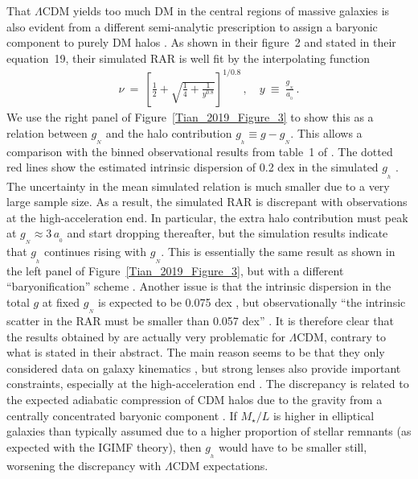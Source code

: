 \documentclass[fleqn,usenatbib,useAMS]{mnras} %
\begin{document}
That $\Lambda$CDM yields too much DM in the central regions of massive galaxies is also evident from a different semi-analytic prescription to assign a baryonic component to purely DM halos \citep{Paranjape_2021}. As shown in their figure~2 and stated in their equation~19, their simulated RAR is well fit by the interpolating function
\begin{eqnarray}
    \nu ~=~ \left[ \frac{1}{2} + \sqrt{\frac{1}{4} + \frac{1}{y^{0.8}}} \right]^{1/0.8} \, , \quad y ~\equiv~ \frac{g_{_N}}{a_{_0}} \, .
    \label{nu_Paranjape}
\end{eqnarray}
We use the right panel of Figure~\ref{Tian_2019_Figure_3} to show this as a relation between $g_{_N}$ and the halo contribution $g_{_h} \equiv g - g_{_N}$. This allows a comparison with the binned observational results from table~1 of \citet{Tian_2019}. The dotted red lines show the estimated intrinsic dispersion of 0.2 dex in the simulated $g_{_h}$ \citep[section~4.1 of][]{Paranjape_2021}. The uncertainty in the mean simulated relation is much smaller due to a very large sample size. As a result, the simulated RAR is discrepant with observations at the high-acceleration end. In particular, the extra halo contribution must peak at $g_{_N} \approx 3 \, a_{_0}$ and start dropping thereafter, but the simulation results indicate that $g_{_h}$ continues rising with $g_{_N}$. This is essentially the same result as shown in the left panel of Figure~\ref{Tian_2019_Figure_3}, but with a different ``baryonification'' scheme \citep{Paranjape_2021_SAM}. Another issue is that the intrinsic dispersion in the total $g$ at fixed $g_{_N}$ is expected to be 0.075 dex \citep{Paranjape_2021}, but observationally ``the intrinsic scatter in the RAR must be smaller than 0.057 dex'' \citep[section~4.1 of][]{Li_2018}. It is therefore clear that the results obtained by \citet{Paranjape_2021} are actually very problematic for $\Lambda$CDM, contrary to what is stated in their abstract. The main reason seems to be that they only considered data on galaxy kinematics \citep{Chae_2019}, but strong lenses also provide important constraints, especially at the high-acceleration end \citep[Section~\ref{Strong_lensing}; see also section~2 of][]{Tian_2019}. The discrepancy is related to the expected adiabatic compression of CDM halos due to the gravity from a centrally concentrated baryonic component \citep{Li_2022, Moreno_2022_expansion}. If $M_{\star}/L$ is higher in elliptical galaxies than typically assumed due to a higher proportion of stellar remnants (as expected with the IGIMF theory), then $g_{_h}$ would have to be smaller still, worsening the discrepancy with $\Lambda$CDM expectations.
\end{document}
